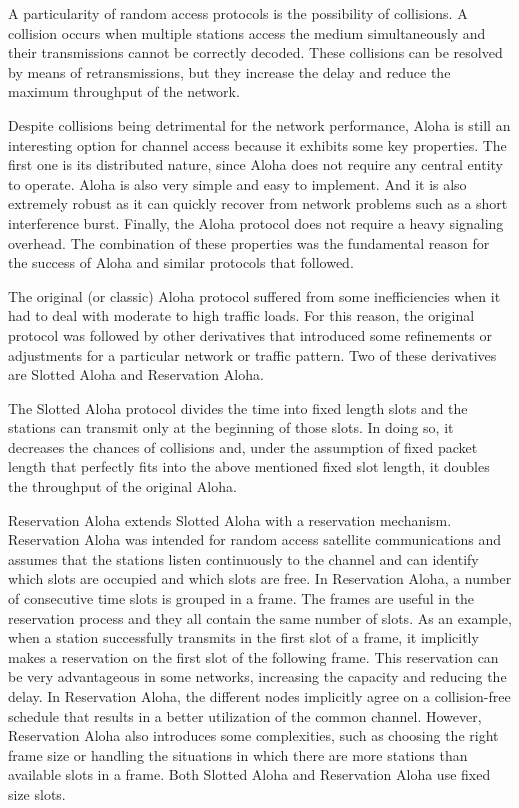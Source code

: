 \documentclass[journal]{IEEEtran}
\begin{document}
A particularity of random access protocols is the possibility of collisions.
A collision occurs when multiple stations access the medium simultaneously and their transmissions cannot be correctly decoded.
These collisions can be resolved by means of retransmissions, but they increase the delay and reduce the maximum throughput of the network.

Despite collisions being detrimental for the network performance, Aloha is still an interesting option for channel access because it exhibits some key properties.
The first one is its distributed nature, since Aloha does not require any central entity to operate.
Aloha is also very simple and easy to implement.
And it is also extremely robust as it can quickly recover from network problems such as a short interference burst.
Finally, the Aloha protocol does not require a heavy signaling overhead.
The combination of these properties was the fundamental reason for the success of Aloha and similar protocols that followed.


The original (or classic) Aloha protocol suffered from some inefficiencies when it had to deal with moderate to high traffic loads.
For this reason, the original protocol was followed by other derivatives that introduced some refinements or adjustments for a particular network or traffic pattern.
Two of these derivatives are Slotted Aloha and Reservation Aloha.

The Slotted Aloha protocol divides the time into fixed length slots and the stations can transmit only at the beginning of those slots.
In doing so, it decreases the chances of collisions and, under the assumption of fixed packet length that perfectly fits into the above mentioned fixed slot length, it doubles the throughput of the original Aloha.

Reservation Aloha \cite{crowther1973sbc,tasaka1983spr} extends Slotted Aloha with a reservation mechanism.
Reservation Aloha was intended for random access satellite communications and assumes that the stations listen continuously to the channel and can identify which slots are occupied and which slots are free.
In  Reservation Aloha, a number of consecutive  time slots is grouped in a frame.
The frames are useful in the reservation process and they all contain the same number of slots.
As an example, when a station successfully transmits in the first slot of a frame, it implicitly makes a reservation on the first slot of the following frame.
This reservation can be very advantageous in some networks, increasing the capacity and reducing the delay.
In Reservation Aloha, the different nodes implicitly agree on a collision-free schedule that results in a better utilization of the common channel.
However, Reservation Aloha also introduces some complexities, such as choosing the right frame size or handling the situations in which there are more stations than available slots in a frame.
Both Slotted Aloha and Reservation Aloha use fixed size slots.
\end{document}
